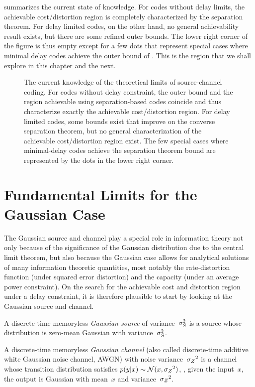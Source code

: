  summarizes the current state of knowledge. For codes
without delay limits, the achievable cost/distortion region is completely
characterized by the separation theorem. For delay limited
codes, on the other hand, no general achievability result exists, but there are
some refined outer bounds. The lower right corner of the figure is thus empty
except for a few dots that represent special cases where minimal delay codes
achieve the outer bound of . This is the region that
we shall explore in this chapter and the next.

\begin{figure}
  \begin{center}
    
  \end{center}
  \caption{The current knowledge of the theoretical limits of source-channel
  coding. For codes without delay constraint, the outer bound and the
  region achievable using separation-based codes coincide and thus characterize
  exactly the achievable cost/distortion region. For delay limited codes, some
  bounds exist that improve on the converse separation theorem, but no general
  characterization of the achievable cost/distortion region exist. The few
  special cases where minimal-delay codes achieve the separation theorem bound
  are represented by the dots in the lower right corner.}
  \label{fig:achievableregions}
\end{figure}


\section{Fundamental Limits for the Gaussian Case}\label{sec:gaussian}

The Gaussian source and channel play a special role in information theory not
only because of the significance of the Gaussian distribution due to the central
limit theorem, but also because the Gaussian case allows for analytical
solutions of many information theoretic quantities, most notably the
rate-distortion function (under squared error distortion) and the capacity
(under an average power constraint). On the search for the achievable cost and
distortion region under a delay constraint, it is therefore plausible to start
by looking at the Gaussian source and channel. 

\begin{definition}
  \label{def:gaussiansc}
  A discrete-time memoryless \emph{Gaussian source} of variance~${\sigma_S^2}$ is a
  source whose distribution is zero-mean Gaussian with variance~${\sigma_S^2}$.

  A discrete-time memoryless \emph{Gaussian channel} (also called discrete-time
  additive white Gaussian noise channel, AWGN) with noise variance~${{\sigma_Z}^2}$ is a
  channel whose transition distribution satisfies $p(y|x) \sim \mathcal{N}(x, {{\sigma_Z}^2})$,
  \ie, given the input~$x$, the output is Gaussian with mean~$x$ and
  variance~${{\sigma_Z}^2}$.
\end{definition}


